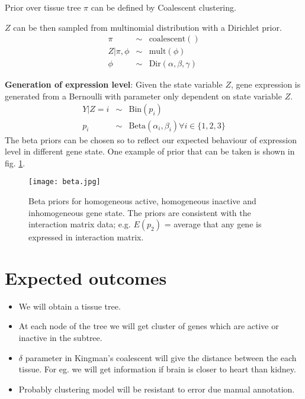 \documentclass{article}
\begin{document}
Prior over tissue tree $\pi$ can be defined by Coalescent clustering. 

$Z$ can be then sampled from multinomial distribution with a Dirichlet prior.
\begin{eqnarray}
	\pi &\sim& \text{coalescent}()\\
	Z|\pi,\phi &\sim& \text{mult}(\phi) \nonumber \\
	\phi &\sim&  \text{Dir}(\alpha,\beta,\gamma) \nonumber
	\label{eqn:zdist1}
\end{eqnarray}

\par \textbf{Generation of expression level}: 
Given the state variable $Z$, gene expression is generated from a Bernoulli with parameter only dependent on state variable $Z$. 
\begin{eqnarray}
	Y|Z = i &\sim& \text{Bin}(p_i) \nonumber \\
	p_i &\sim&  \text{Beta}(\alpha_i,  \beta_i) \forall i \in \{1,2,3\}  
	\label{eqn:ydist}
\end{eqnarray}
The beta priors can be chosen so to reflect our expected behaviour of expression level in different gene state. One example of prior that can be taken
is shown in fig. \ref{fig:betaP}.
\begin{figure}[ht]
	\begin{center}
		\texttt{[image: beta.jpg]}
	\end{center}
	\caption{Beta priors for homogeneous active, homogeneous inactive and inhomogeneous gene state. The priors are consistent
	with the interaction matrix data; e.g. $E(p_2)$ = average that any gene is expressed in interaction matrix.}
	\label{fig:betaP}
\end{figure}


\section{Expected outcomes}
\begin{itemize}
	\item We will obtain a tissue tree. 
	\item At each node of the tree we will get cluster of genes which are active or inactive in the subtree.
	\item $\delta$ parameter in Kingman's coalescent will give the distance between the each tissue. For eg. we will get information if brain is closer to heart
		than kidney. 
	\item Probably clustering model will be resistant to error due manual annotation.
\end{itemize}



\end{document}
